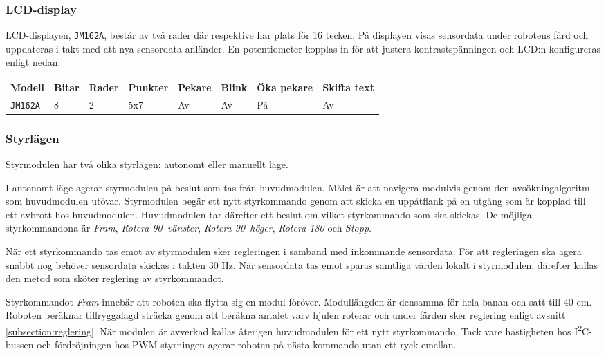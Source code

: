 \documentclass[11pt]{article}
\begin{document}
\begin{flushleft}
\subsubsection{LCD-display}
LCD-displayen, \verb+JM162A+, består av två rader där respektive har plats för 16 tecken. På displayen visas sensordata under robotens färd och uppdateras i takt med att nya sensordata anländer. En potentiometer kopplas in för att justera kontrastspänningen och LCD:n konfigureras enligt nedan.

\begin{center}
  \begin{tabular}{l l l l l l l l}
      \textbf{Modell} & \textbf{Bitar} & \textbf{Rader} & \textbf{Punkter} & \textbf{Pekare} & \textbf{Blink} & \textbf{Öka pekare} & \textbf{Skifta text} \\
      \verb+JM162A+ & 8 & 2 & 5x7 & Av & Av & På & Av \\
    \end{tabular}
  \end{center}

\subsubsection{Styrlägen}
Styrmodulen har två olika styrlägen: autonomt eller manuellt läge.
\begin{description}[style=unboxed, leftmargin=0cm]
  \item[Autonomt läge]
I autonomt läge agerar styrmodulen på beslut som tas från huvudmodulen. Målet är att navigera modulvis genom den avsökningalgoritm som huvudmodulen utövar. Styrmodulen begär ett nytt styrkommando genom att skicka en uppåtflank på en utgång som är kopplad till ett avbrott hos huvudmodulen. Huvudmodulen tar därefter ett beslut om vilket styrkommando som ska skickas. De möjliga styrkommandona är \textit{Fram}, \textit{Rotera 90\textdegree\ vänster}, \textit{Rotera 90\textdegree\ höger}, \textit{Rotera 180\textdegree} och \textit{Stopp}. 

När ett styrkommando tas emot av styrmodulen sker regleringen i samband med inkommande sensordata. För att regleringen ska agera snabbt nog behöver sensordata skickas i takten $30$ Hz. När sensordata tas emot sparas samtliga värden lokalt i styrmodulen, därefter kallas den metod som sköter reglering av styrkommandot. 

Styrkommandot \textit{Fram} innebär att roboten ska flytta sig en modul föröver. Modullängden är densamma för hela banan och satt till $40$ cm. Roboten beräknar tillryggalagd sträcka genom att beräkna antalet varv hjulen roterar och under färden sker reglering enligt avsnitt \ref{subsection:reglering}. När modulen är avverkad kallas återigen huvudmodulen för ett nytt styrkommando. Tack vare hastigheten hos I\textsuperscript{2}C-bussen och fördröjningen hos PWM-styrningen agerar roboten på nästa kommando utan ett ryck emellan. 


\end{description}
\end{flushleft}
\end{document}
